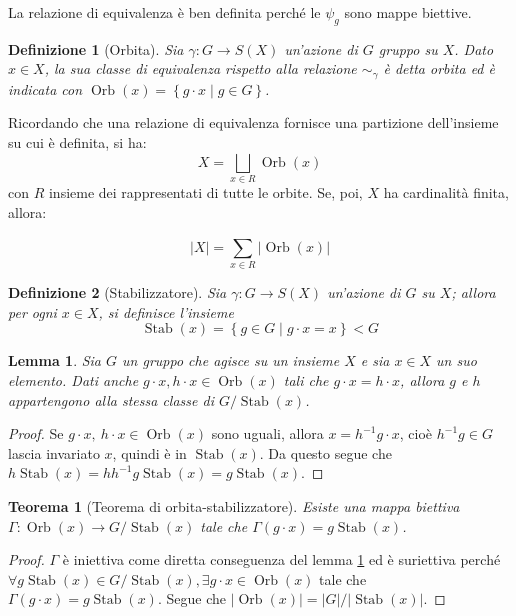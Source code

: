 \documentclass[11pt]{article}
\theoremstyle{style}
\newtheorem{definizione}{Definizione}[section]
\newtheorem{teorema}{Teorema}[section]
\newtheorem{lemma}{Lemma}[teorema]
\newenvironment{boxenv}[1][]{
    \begin{eqbox}[#1]
    }{
   \end{eqbox}
}
\numberwithin{equation}{subsection}
\begin{document}
La relazione di equivalenza \`e ben definita perch\'e le $\psi _g$ sono mappe biettive.
\begin{definizione}
	[Orbita]
	Sia $\gamma :G \to S(X)$ un'azione di $G$ gruppo su $X$. Dato $x \in X$, la sua classe di equivalenza rispetto alla relazione $\sim _\gamma$ \`e detta \textit{orbita} ed \`e indicata con $\operatorname{Orb} (x) = \left\{ g \cdot  x  \mid g \in G\right\} $.
\end{definizione}
\noindent Ricordando che una relazione di equivalenza fornisce una partizione dell'insieme su cui \`e definita, si ha:
\begin{equation}
	X = \bigsqcup_{x \in R} \operatorname{Orb} (x)
\end{equation}
con $R$ insieme dei rappresentati di tutte le orbite.
Se, poi, $X$ ha cardinalit\`a finita, allora:
\begin{boxenv}[]
\begin{equation}
	\lvert X \rvert  = \sum_{x \in R}^{} \lvert \operatorname{Orb} (x) \rvert 
\end{equation}
\end{boxenv}
\begin{definizione}
	[Stabilizzatore]
	Sia $\gamma: G \to S(X)$ un'azione di $G$ su $X$; allora per ogni $x \in X$, si definisce l'insieme 
	\[
	\operatorname{Stab} (x) = \left\{ g \in G  \mid g \cdot  x = x \right\} < G 
	\] 	
\end{definizione}
\begin{lemma}\label{l111}
	Sia $G$ un gruppo che agisce su un insieme $X$ e sia $x \in X$ un suo elemento. Dati anche $g\cdot x , h \cdot x \in \operatorname{Orb} (x)$ tali che $g \cdot x = h\cdot x$, allora $g$ e $h$ appartengono alla stessa classe di $G / \operatorname{Stab} (x)$.
\end{lemma}
\begin{proof}
	Se $g \cdot x, \ h\cdot x \in \operatorname{Orb} (x)$ sono uguali, allora $x =h^{-1} g \cdot x $, cio\`e $h^{-1} g \in G$ lascia invariato $x$, quindi \`e in $\operatorname{Stab} (x)$.
	Da questo segue che $h \operatorname{Stab} (x) = h h^{-1} g \operatorname{Stab} (x) = g \operatorname{Stab} (x)$.
\end{proof}
\begin{teorema}[Teorema di orbita-stabilizzatore]\label{osth}
	Esiste una mappa biettiva $\Gamma : \operatorname{Orb} (x) \to G / \operatorname{Stab} (x)$ tale che $\Gamma(g \cdot x) = g \operatorname{Stab} (x)$.
\end{teorema}
	\begin{proof}
		$\Gamma$ \`e iniettiva come diretta conseguenza del lemma \ref{l111} ed \`e suriettiva perch\'e $\forall g \operatorname{Stab} (x) \in G / \operatorname{Stab} (x), \exists g\cdot x \in \operatorname{Orb} (x)$ tale che $\Gamma(g\cdot x) = g \operatorname{Stab} (x)$.
		Segue che $\lvert \operatorname{Orb} (x)  \rvert = \lvert G \rvert / \lvert \operatorname{Stab} (x) \rvert $.
	\end{proof}
\end{document}
